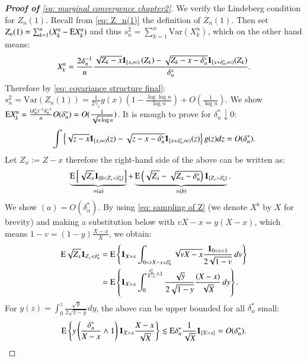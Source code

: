 \begin{proof}[\hypertarget{proof of lemma 2}{\textbf{Proof of}} \eqref{eq: marginal convergence chapter2}]
We verify the Lindeberg condition for $Z_n(1)$. Recall from \eqref{eq: Z_n(1)} the definition of $Z_n(1)$. Then set $Z_n(1) = \sum_{k=1}^{n} (X^n_k - \mathrm{E} X^n_k)$ and thus $s^2_n = \sum_{k=1}^{n}\mathrm{Var}(X^n_k)$, which on the other hand means:
\begin{align*}
X_k^n = \frac{2\delta_n^{-1}}{n} \frac{\sqrt{Z_k-x} \mathbf{1}_{[x, \infty)}\left(Z_k\right)-\sqrt{Z_k -x-\delta_n^*} \mathbf{1}_{\left[x+\delta_n^*, \infty\right)} (Z_k)}{\delta_n^*}.  
\end{align*}
Therefore by \eqref{eq: covariance structure final}: $s_n^2 = \mathrm{Var}\left( Z_n(1)\right)=\frac{1}{2 \gamma_x} g(x) \left(1-\frac{\log \log n}{\log n}\right)+O\left(\frac{1}{\log n}\right)$. We show $\mathrm{E}  X^n_k = \frac{(\delta^*_n)^{-1} \delta_n^{-1}}{n} O(\delta^*_n) = O(\frac{1}{\sqrt{n \log{n}}})$. It is enough to prove for $\delta^*_n \downarrow 0$:
\begin{align}\label{eq: enough to be shown}
    \int \left\{ \sqrt{z-x} \mathbf{1}_{[x, \infty)}(z)-\sqrt{z-x-\delta_n^* } \mathbf{1}_{\left[x+\delta_n^* , \infty\right)}(z) \right\} g (z) d z = O(\delta^*_n).
\end{align}
Let $Z_x := Z -x$ therefore the right-hand side of the above can be written as:
\begin{align*}
& \underbrace{\mathrm{E} \left[ \sqrt{Z_x} \mathbf{1}_{\{0 < Z_x < \delta^*_n \}}  \right]}_{=(a)} +\underbrace{\mathrm{E} \left( \sqrt{Z_x} - \sqrt{Z_x - \delta^*_n} \right) \mathbf{1}_{\{Z_x > \delta^*_n \}}}_{=(b)}.
\end{align*}
We show $(a) = O(\delta^*_n)$. By using \eqref{eq: sampling of Z} (we denote $X^b$ by $X$ for brevity) and making a substitution below with $vX - x = y(X-x)$, which means $1-v = (1-y)\frac{X-x}{X}$, we obtain:
\begin{align*}
    \mathrm{E}  \sqrt{Z_x} \mathbf{1}_{Z_x < \delta^*_n} &= \mathrm{E}  \left\{ \mathbf{1}_{X > x} \int_{0 < vX - x < \delta^*_n} \sqrt{vX -x} \frac{\mathbf{1}_{0<v<1}}{2 \sqrt{1 - v}} \, dv \right\}  \\
    &= \mathrm{E}  \left\{ \mathbf{1}_{X> x} \int_{0}^{\frac{\delta^*_n}{X - x} \wedge 1} \frac{\sqrt{y}}{2 \sqrt{1-y}} \frac{(X-x)}{\sqrt{X}} \, dy \right\}.
\end{align*}
For $y(z) = \int_{0}^{z} \frac{\sqrt{y}}{2 \sqrt{1-y}} dy$, the above can be upper bounded for all $\delta^*_n$ small:
\begin{align}\label{eq: equation to upper bound Z_x}
    \ex  \left\{  y\left(\frac{\delta^*_n}{X - x} \wedge 1 \right) \ind_{X> x} \frac{X-x}{\sqrt{X}} \right\} \lesssim \ex  \delta^*_n \frac{1}{\sqrt{X}} \ind_{\{X > x \}} = O(\delta^*_n).

\end{align}
\end{proof}
